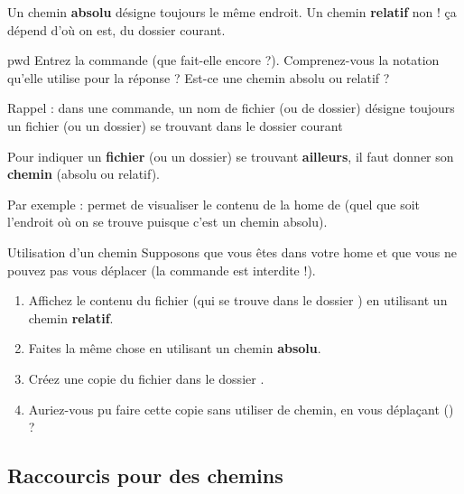 \documentclass[a4paper,11pt]{style-esi/td}
\begin{document}
		\begin{alertbox}
			Un chemin \textbf{absolu} désigne toujours le même endroit.
			Un chemin \textbf{relatif} non ! \c ca dépend d'où on est,
			du dossier courant.
		\end{alertbox}

		\begin{Exercice}{pwd}
			Entrez la commande  (que fait-elle encore ?). 
			Comprenez-vous la notation qu'elle utilise pour la réponse ?
			Est-ce une chemin absolu ou relatif ?
		\end{Exercice}

		\begin{infobox}
			Rappel : dans une commande, un nom de fichier (ou de dossier)
			désigne toujours un fichier (ou un dossier) se trouvant
			dans le dossier courant
	
			Pour indiquer un \textbf{fichier} (ou un dossier) 
			se trouvant \textbf{ailleurs},
			il faut donner son \textbf{chemin} (absolu ou relatif).
		\end{infobox}

		Par exemple : 
		permet de visualiser le contenu de la home de 
		(quel que soit l'endroit où on se trouve puisque c'est un chemin absolu).
		
		\begin{Exercice}{Utilisation d'un chemin}
			Supposons que vous êtes dans votre home 
			et que vous ne pouvez pas vous déplacer 
			(la commande  est interdite !).
			\begin{enumerate}
			\item 
				Affichez le contenu du fichier 
				(qui se trouve dans le dossier )
				en utilisant un chemin \textbf{relatif}.
			\item 
				Faites la même chose 
				en utilisant un chemin \textbf{absolu}.
			\item
				Créez une copie du fichier  
				dans le dossier .
			\item 
				Auriez-vous pu faire cette copie 
				sans utiliser de chemin,
				en vous déplaçant () ?
			\end{enumerate}
		\end{Exercice}

	\subsection{Raccourcis pour des chemins}
\end{document}
